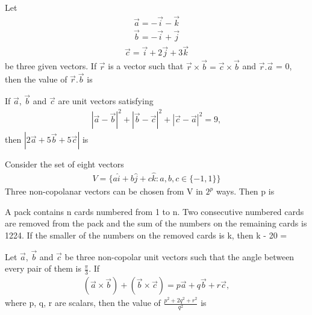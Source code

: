 \item Let 
\begin{align*}
\overrightarrow{a} = -\overrightarrow{i} - \overrightarrow{k}
\end{align*}
\begin{align*}
\overrightarrow{b} = -\overrightarrow{i} + \overrightarrow{j}
\end{align*}
\begin{align*}
\overrightarrow{c} = \overrightarrow{i} + 2\overrightarrow{j} + 3\overrightarrow{k}
\end{align*}
be three given vectors. If $\overrightarrow{r}$ is a vector such that $\overrightarrow{r} \times \overrightarrow{b} = \overrightarrow{c} \times \overrightarrow{b}$ and $\overrightarrow{r}.\overrightarrow{a}$ = 0, then the value of $\overrightarrow{r}.\overrightarrow{b}$ is

\item If $\overrightarrow{a}$, $\overrightarrow{b}$ and $\overrightarrow{c}$ are unit vectors satisfying
\begin{align*}
|\overrightarrow{a}-\overrightarrow{b}|^{2} + |\overrightarrow{b}-\overrightarrow{c}|^{2} + |\overrightarrow{c}-\overrightarrow{a}|^{2} = 9,
\end{align*}
then $|2\overrightarrow{a} + 5\overrightarrow{b} + 5\overrightarrow{c}|$ is

\item Consider the set of eight vectors
\begin{align*}
V = \{a\hat{i} + b\hat{j} + c\hat{k}:a, b, c \in \{-1, 1\}\}
\end{align*}
Three non-copolanar vectors can be chosen from V in $2^{p}$ ways. Then p is 

\item A pack contains n cards numbered from 1 to n. Two consecutive numbered cards are removed from the pack and the sum of the numbers on the remaining cards is 1224. If the smaller of the numbers on the removed cards is k, then k - 20 = 

\item Let $\overrightarrow{a}$, $\overrightarrow{b}$ and $\overrightarrow{c}$ be three non-copolar unit vectors such that the angle between every pair of them is $\frac{\pi}{3}$. If 
\begin{align*}
(\overrightarrow{a} \times \overrightarrow{b}) + (\overrightarrow{b} \times \overrightarrow{c}) = p\overrightarrow{a} + q\overrightarrow{b} + r\overrightarrow{c},
\end{align*}
where p, q, r are scalars, then the value of $\frac{p^{2} + 2q^{2} + r^{2}}{q^{2}}$ is

